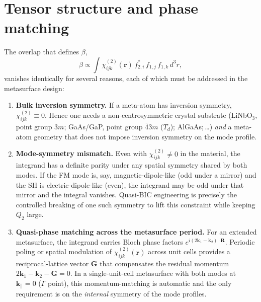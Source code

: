 \documentclass[11pt,a4paper]{article}
\newcommand{\bvec}[1]{\mathbf{#1}}
\newcommand{\ri}{\bvec{r}}
\newcommand{\dthreer}{\,d^{3}r}
\newcommand{\chitwo}{\chi^{(2)}}
\begin{document}
\section{Tensor structure and phase matching}\label{sec:tensor}

The overlap that defines $\beta$,
\begin{equation*}
  \beta\propto\!\int\!\chitwo_{ijk}(\ri)\,f_{2,i}^*\,f_{1,j}\,f_{1,k}\dthreer,
\end{equation*}
vanishes identically for several reasons, each of which must be
addressed in the metasurface design:
\begin{enumerate}
  \item \textbf{Bulk inversion symmetry.} If a meta-atom has inversion
        symmetry, $\chitwo_{ijk}\equiv 0$.  Hence one needs a
        non-centrosymmetric crystal substrate (LiNbO$_3$, point group
        $3m$; GaAs/GaP, point group $\bar{4}3m$ ($T_d$); AlGaAs;\,\dots)
        \emph{and} a meta-atom geometry that does not impose inversion
        symmetry on the mode profile.

  \item \textbf{Mode-symmetry mismatch.} Even with $\chitwo_{ijk}\neq 0$
        in the material, the integrand has a definite parity under any
        spatial symmetry shared by both modes.  If the FM mode is, say,
        magnetic-dipole-like (odd under a mirror) and the SH is
        electric-dipole-like (even), the integrand may be odd under
        that mirror and the integral vanishes.  Quasi-BIC engineering
        is precisely the controlled breaking of one such symmetry to
        lift this constraint while keeping $Q_2$ large.

  \item \textbf{Quasi-phase matching across the metasurface period.}
        For an extended metasurface, the integrand carries Bloch phase
        factors $e^{i(2\bvec{k}_1-\bvec{k}_2)\cdot\bvec{R}}$.  Periodic
        poling or spatial modulation of $\chitwo_{ijk}(\ri)$ across
        unit cells provides a reciprocal-lattice vector $\bvec{G}$ that
        compensates the residual momentum
        $2\bvec{k}_1-\bvec{k}_2-\bvec{G}=0$.  In a single-unit-cell
        metasurface with both modes at $\bvec{k}_\parallel=0$
        ($\Gamma$ point), this momentum-matching is automatic and the
        only requirement is on the \emph{internal} symmetry of the mode
        profiles.
\end{enumerate}
\end{document}
